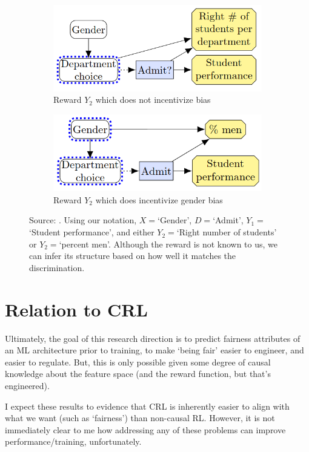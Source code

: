 \documentclass[letterpaper,10pt]{article}
\begin{document}
\begin{figure}
\centering
\begin{subfigure}{.5\textwidth}
  \centering
  \includegraphics[width=.8\linewidth]{pics/berkeley_A.png}
  \caption{Reward $Y_2$ which does not incentivize bias}
  \label{fig:berkeley_fair}
\end{subfigure}%
\begin{subfigure}{.5\textwidth}
  \centering
  \includegraphics[width=.8\linewidth]{pics/berkeley_B.png}
  \caption{Reward $Y_2$ which does incentivize gender bias}
  \label{fig:berkeley_unfair}
\end{subfigure}
\caption{Source: \cite{everitt2022understanding}. Using our notation, $X=$`Gender', $D=$`Admit', $Y_1=$`Student performance', and either $Y_2=$`Right number of students' or $Y_2=$`percent men'. Although the reward is not known to us, we can infer its structure based on how well it matches the discrimination.}
\label{fig:berkeley}
\end{figure}


\section{Relation to CRL}\label{CRL}
Ultimately, the goal of this research direction is to predict fairness attributes of an ML architecture prior to training, to make `being fair' easier to engineer, and easier to regulate. But, this is only possible given some degree of causal knowledge about the feature space (and the reward function, but that's engineered).

I expect these results to evidence that CRL is inherently easier to align with what we want (such as `fairness') than non-causal RL. However, it is not immediately clear to me how addressing any of these problems can improve performance/training, unfortunately. 
\end{document}

